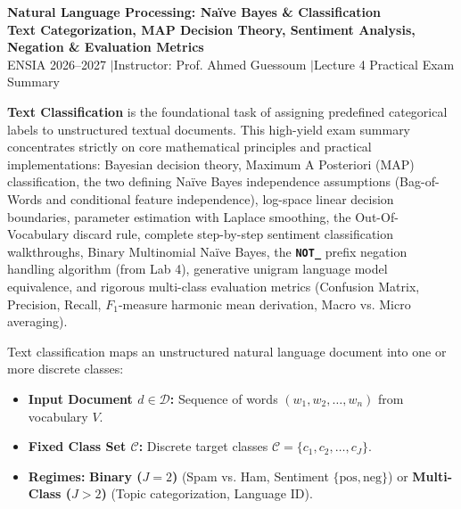 \documentclass[10pt,a4paper]{article}
\newcommand{\rx}[1]{\texttt{\bfseries\color{inlinecode}#1}}
\begin{document}
\begin{center}
    \vspace{-4pt}
    {\LARGE\bfseries\color{themeblue} Natural Language Processing: Naïve Bayes \& Classification}\\[1.5pt]
    {\normalsize\bfseries Text Categorization, MAP Decision Theory, Sentiment Analysis, Negation \& Evaluation Metrics}\\[1.5pt]
    {\footnotesize\color{darkgray} ENSIA 2026--2027 \quad$\vert$\quad Instructor: Prof. Ahmed Guessoum \quad$\vert$\quad Lecture 4 Practical Exam Summary}
\end{center}

\vspace{-7pt}

\begin{overviewbox}\vspace{-1pt}
\footnotesize
\textbf{Text Classification} is the foundational task of assigning predefined categorical labels to unstructured textual documents. This high-yield exam summary concentrates strictly on core mathematical principles and practical implementations: Bayesian decision theory, Maximum A Posteriori (MAP) classification, the two defining Naïve Bayes independence assumptions (Bag-of-Words and conditional feature independence), log-space linear decision boundaries, parameter estimation with Laplace smoothing, the Out-Of-Vocabulary discard rule, complete step-by-step sentiment classification walkthroughs, Binary Multinomial Naïve Bayes, the \rx{NOT\_} prefix negation handling algorithm (from Lab 4), generative unigram language model equivalence, and rigorous multi-class evaluation metrics (Confusion Matrix, Precision, Recall, $F_1$-measure harmonic mean derivation, Macro vs. Micro averaging).
\vspace{-1pt}\end{overviewbox}

\vspace{-3pt}

\par\vspace{1pt}
Text classification maps an unstructured natural language document into one or more discrete classes:
\begin{itemize}[leftmargin=12pt, itemsep=0.5pt, parsep=0pt, topsep=0.5pt]
    \item \textbf{Input Document $d \in \mathcal{D}$:} Sequence of words $(w_1, w_2, \dots, w_n)$ from vocabulary $V$.
    \item \textbf{Fixed Class Set $\mathcal{C}$:} Discrete target classes $\mathcal{C} = \{c_1, c_2, \dots, c_J\}$.
    \item \textbf{Regimes:} \textbf{Binary ($J=2$)} (Spam vs. Ham, Sentiment $\{\text{pos}, \text{neg}\}$) or \textbf{Multi-Class ($J>2$)} (Topic categorization, Language ID).
\end{itemize}
\end{document}
